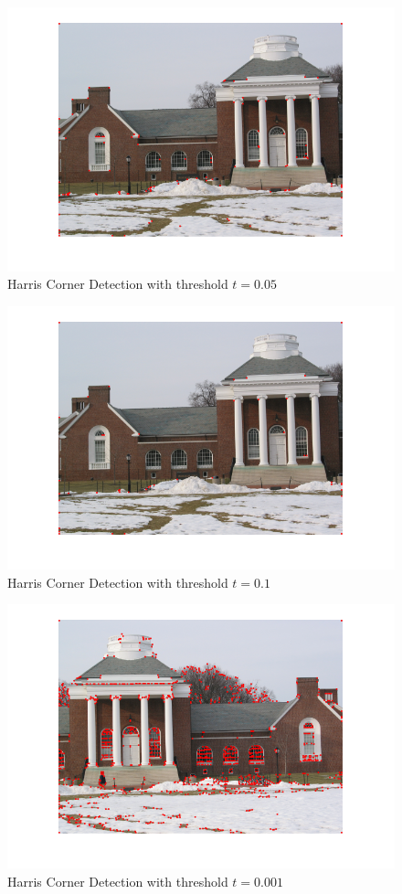 \documentclass[letterpaper]{article}
\begin{document}
\begin{figure}[H]
\centering
\includegraphics[scale=0.7]{I1t005.png}
\caption{Harris Corner Detection with threshold $t = 0.05$}
\label{tr3}
\end{figure}
\begin{figure}[H]
\centering
\includegraphics[scale=0.7]{I1t01.png}
\caption{Harris Corner Detection with threshold $t = 0.1$}
\label{tr4}
\end{figure}
\begin{figure}[H]
\centering
\includegraphics[scale=0.7]{I3t0001.png}
\caption{Harris Corner Detection with threshold $t = 0.001$}
\label{rt5}
\end{figure}
\end{document}
